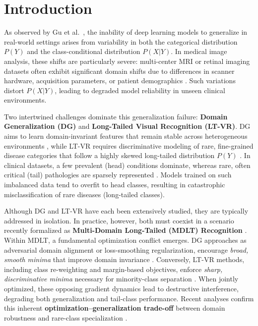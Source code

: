 \documentclass[runningheads]{llncs}
\begin{document}
\section{Introduction}

    \label{fig:main}
As observed by Gu et al.~\cite{Gu22}, the inability of deep learning models to generalize in real-world settings arises from variability in both the categorical distribution \(P(Y)\) and the class-conditional distribution \(P(X|Y)\). In medical image analysis, these shifts are particularly severe: multi-center MRI or retinal imaging datasets often exhibit significant domain shifts due to differences in scanner hardware, acquisition parameters, or patient demographics \cite{Lei22, Chen23, Li23a}. Such variations distort \(P(X|Y)\), leading to degraded model reliability in unseen clinical environments. 

Two intertwined challenges dominate this generalization failure: \textbf{Domain Generalization (DG)} and \textbf{Long-Tailed Visual Recognition (LT-VR)}. DG aims to learn domain-invariant features that remain stable across heterogeneous environments \cite{Wang21}, while LT-VR requires discriminative modeling of rare, fine-grained disease categories that follow a highly skewed long-tailed distribution \(P(Y)\) \cite{Zhang21, Li18}. In clinical datasets, a few prevalent (head) conditions dominate, whereas rare, often critical (tail) pathologies are sparsely represented \cite{CXR24}. Models trained on such imbalanced data tend to overfit to head classes, resulting in catastrophic misclassification of rare diseases (long-tailed classes).

Although DG and LT-VR have each been extensively studied, they are typically addressed in isolation. In practice, however, both must coexist in a scenario recently formalized as \textbf{Multi-Domain Long-Tailed (MDLT) Recognition} \cite{Yang22}. Within MDLT, a fundamental optimization conflict emerges. DG approaches as adversarial domain alignment or loss-smoothing regularization, encourage \emph{broad, smooth minima} that improve domain invariance \cite{Su24, Su24a}. Conversely, LT-VR methods, including class re-weighting and margin-based objectives, enforce \emph{sharp, discriminative minima} necessary for minority-class separation \cite{TSCNet25}. When jointly optimized, these opposing gradient dynamics lead to destructive interference, degrading both generalization and tail-class performance. Recent analyses confirm this inherent \textbf{optimization–generalization trade-off} between domain robustness and rare-class specialization \cite{Yang22, Zhang21, Su24a}. %
\end{document}
